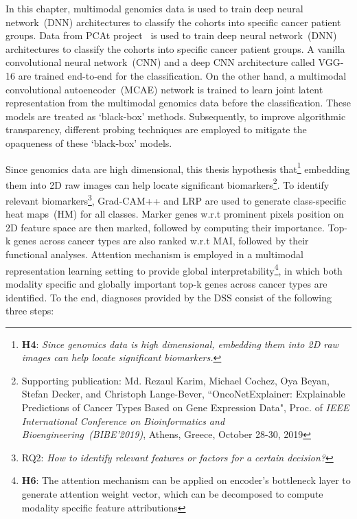 \hspace*{3.5mm} In this chapter, multimodal genomics data is used to train deep neural network~(DNN) architectures to classify the cohorts into specific cancer patient groups. Data from PCAt project~\cite{weinstein2013cancer} is used to train deep neural network~(DNN) architectures to classify the cohorts into specific cancer patient groups. A vanilla convolutional neural network~(CNN) and a deep CNN architecture called VGG-16 are trained end-to-end for the classification. On the other hand, a multimodal convolutional autoencoder~(MCAE) network is trained to learn joint latent representation from the multimodal genomics data before the classification. These models are treated as `black-box' methods. Subsequently, to improve algorithmic transparency, different probing techniques are employed to mitigate the opaqueness of these `black-box' models. 

\hspace*{3.5mm} Since genomics data are high dimensional, this thesis hypothesis that\footnote{\textbf{H4}: \textit{Since genomics data is high dimensional, embedding them into 2D raw images can help locate significant biomarkers.}} embedding them into 2D raw images can help locate significant biomarkers\footnote{Supporting publication: Md. Rezaul Karim, Michael Cochez, Oya Beyan, Stefan Decker, and Christoph Lange-Bever, ``OncoNetExplainer: Explainable Predictions of Cancer Types Based on Gene Expression Data", Proc. of \emph{IEEE International Conference on Bioinformatics and Bioengineering~(BIBE'2019)}, Athens, Greece, October 28-30, 2019}. %
To identify relevant biomarkers\footnote{RQ2: \textit{How to identify relevant features or factors for a certain decision?}}, Grad-CAM++ and LRP are used to generate class-specific heat maps~(HM) for all classes. 
Marker genes w.r.t prominent pixels position on 2D feature space are then marked, followed by computing their importance. Top-k genes across cancer types are also ranked w.r.t MAI, followed by their functional analyses.  
Attention mechanism is employed in a multimodal representation learning setting to provide global interpretability\footnote{\textbf{H6}: The attention mechanism can be applied on encoder's bottleneck layer to generate attention weight vector, which can be decomposed to compute modality specific feature attributions}, in which both modality specific and globally important top-k genes across cancer types are identified. To the end, diagnoses provided by the DSS consist of the following three steps: 

